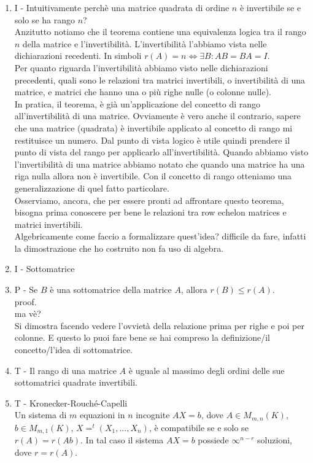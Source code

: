 \documentclass[]{article}
\begin{document}
\begin{enumerate}
			  Chiaramente per concludere il rango non pu\`o essere superiore a $n$, pertanto il rango di una matrice invertibile \`e $n$.
	\item I - Intuitivamente perch\`e una matrice quadrata di ordine $n$ \`e invertibile se e solo se ha rango $n$? \\
			  Anzitutto notiamo che il teorema contiene una equivalenza logica tra il rango $n$ della matrice e l'invertibilit\`a. L'invertibilit\`a l'abbiamo vista nelle dichiarazioni recedenti. In simboli $r(A) = n \Leftrightarrow \exists B : AB=BA=I$.	\\
			  Per quanto riguarda l'invertibilit\`a abbiamo visto nelle dichiarazioni precedenti, quali sono le relazioni tra matrici invertibili, o invertibilit\`a di una matrice, e matrici che hanno una o pi\`u righe nulle (o colonne nulle). \\
			  In pratica, il teorema, \`e gi\`a un'applicazione del concetto di rango all'invertibilit\`a di una matrice. Ovviamente \`e vero anche il contrario, sapere che una matrice (quadrata) \`e invertibile applicato al concetto di rango mi restituisce un numero. Dal punto di vista logico \`e utile quindi prendere il punto di vista del rango per applicarlo all'invertibilit\`a. Quando abbiamo visto l'invertibilit\`a di una matrice abbiamo notato che quando una matrice ha una riga nulla allora non \`e invertibile. Con il concetto di rango otteniamo una generalizzazione di quel fatto particolare. \\
			  Osserviamo, ancora, che per essere pronti ad affrontare questo teorema, bisogna prima conoscere per bene le relazioni tra row echelon matrices e matrici invertibili. \\
			  Algebricamente come faccio a formalizzare quest'idea? difficile da fare, infatti la dimostrazione che ho costruito non fa uso di algebra.
	\item I - Sottomatrice	
	\item P - Se $B$ \`e una sottomatrice della matrice $A$, allora $r(B) \le r(A)$. \\
	 		  proof. \\
	 		  ma v\`e? \\
	 		  Si dimostra facendo vedere l'ovviet\`a della relazione prima per righe e poi per colonne. E questo lo puoi fare bene se hai compreso la definizione/il concetto/l'idea di sottomatrice.	
	\item T - Il rango di una matrice $A$ \`e uguale al massimo degli ordini delle sue sottomatrici quadrate invertibili.	
	\item T - Kronecker-Rouch\'e-Capelli \\
	          Un sistema di $m$ equazioni in $n$ incognite $AX=b$, dove $A \in M_{m,n}(K)$, $b \in M_{m,1}(K)$, $X= ^{t}(X_1, ..., X_n)$, \`e compatibile se e solo se $r(A)=r(Ab)$. In tal caso il sistema $AX=b$ possiede $\infty^{n-r}$ soluzioni, dove $r = r(A)$.
	          

\end{enumerate}
\end{document}
